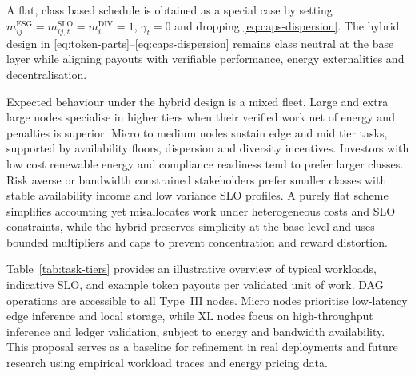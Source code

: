 \documentclass[oneside,10pt]{swissi}
\begin{document}
A flat, class based schedule is obtained as a special case by setting \(m^{\mathrm{ESG}}_{ij}=m^{\mathrm{SLO}}_{ij,t}=m^{\mathrm{DIV}}_{i}=1\), \(\gamma_t=0\) and dropping \eqref{eq:caps-dispersion}. The hybrid design in \eqref{eq:token-parts}–\eqref{eq:caps-dispersion} remains class neutral at the base layer while aligning payouts with verifiable performance, energy externalities and decentralisation.

Expected behaviour under the hybrid design is a mixed fleet. Large and extra large nodes specialise in higher tiers when their verified work net of energy and penalties is superior. Micro to medium nodes sustain edge and mid tier tasks, supported by availability floors, dispersion and diversity incentives. Investors with low cost renewable energy and compliance readiness tend to prefer larger classes. Risk averse or bandwidth constrained stakeholders prefer smaller classes with stable availability income and low variance SLO profiles. A purely flat scheme simplifies accounting yet misallocates work under heterogeneous costs and SLO constraints, while the hybrid preserves simplicity at the base level and uses bounded multipliers and caps to prevent concentration and reward distortion.

Table~\ref{tab:task-tiers} provides an illustrative overview of typical workloads, indicative SLO, and example token payouts per validated unit of work. DAG operations are accessible to all Type~III nodes. Micro nodes prioritise low-latency edge inference and local storage, while XL nodes focus on high-throughput inference and ledger validation, subject to energy and bandwidth availability. This proposal serves as a baseline for refinement in real deployments and future research using empirical workload traces and energy pricing data.
\end{document}
